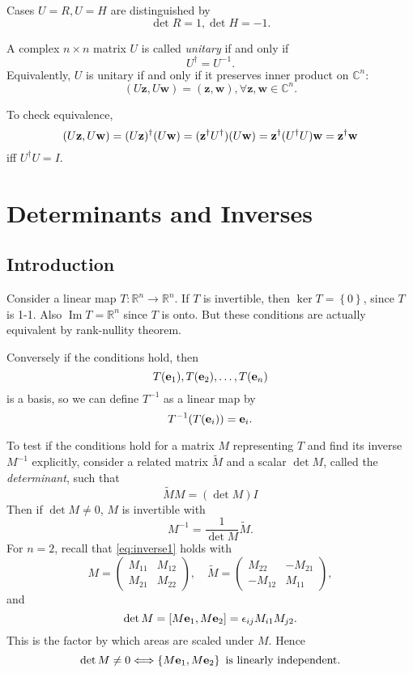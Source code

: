 \documentclass[10pt]{article}
\DeclareMathOperator{\im}{Im}
\begin{document}
    \begin{remark}
        Cases $ U=R, U=H $ are distinguished by 
        \[
            \det R=1, \det H=-1
        .\]
    \end{remark}
    \begin{definition}
        A complex $n\times n$ matrix $U$ is called \textit{unitary} if and only if 
        \[
            U^\dagger =U^{-1}
        .\]
        Equivalently, $U$ is unitary if and only if it preserves inner product on $ \mathbb{C}^{n} $:
        \[
            (U \mathbf{z}, U \mathbf{w})=(\mathbf{z},\mathbf{w}), \forall \mathbf{z},\mathbf{w}\in \mathbb{C}^{n}
        .\]
    \end{definition}
    To check equivalence, 
    \[
            (U \mathbf{z}, U \mathbf{w})=(U \mathbf{z})^\dagger (U \mathbf{w})=({\bf z}^\dagger U^\dagger )(U {\bf w} )={\bf z}^\dagger (U^\dagger U){\bf w}={\bf z}^\dagger {\bf w}
    \]
    iff $ U^\dagger U=I $.
    \section{Determinants and Inverses}
    \subsection{Introduction}
    Consider a linear map $ T: \mathbb{R}^{n}\to \mathbb{R}^{n} $. If $T$ is invertible, then $ \ker T=\left\{ 0\right\} $, since $T$ is 1-1. Also $ \im T=\mathbb{R}^{n} $ since $T$ is onto. But these conditions are actually equivalent by rank-nullity theorem.

    Conversely if the conditions hold, then
    \[
        T(\mathbf{e}_1), T(\mathbf{e}_2),\dots,T({\bf e}_n)
    \]
    is a basis, so we can define $ T^{-1} $ as a linear map by 
    \[
        T^{-1}(T({\bf e}_i))={\bf e}_i
    .\]

    To test if the conditions hold for a matrix $M$ representing $T$ and find its inverse $M^{-1}$ explicitly, consider a related matrix $ \tilde{M} $ and a scalar $ \det M $, called the \textit{determinant}, such that 
    \begin{equation}\label{eq:inverse1}
        \tilde{M}M=(\det M)I
    \end{equation}
    Then if $ \det M\neq 0 $, $M$ is invertible with
    \[
        M^{-1}=\frac{1}{\det M}\tilde{M}
    .\]
    For $n=2$, recall that \ref{eq:inverse1} holds with 
    \[
        M=\begin{pmatrix}
            M_{11}&M_{12}\\
            M_{21}&M_{22}
        \end{pmatrix},\quad \tilde{M}=\begin{pmatrix}
            M_{22}&-M_{21}\\
            -M_{12}&M_{11}
        \end{pmatrix},
    \]
    and 
    \[
        \det M=[M {\bf e}_1, M{\bf e}_2]=\epsilon_{ij}M_{i1}M_{j2}
    .\]
    This is the factor by which areas are scaled under $M$. Hence 
    \[
        \det M \neq 0 \Longleftrightarrow \left\{ M{\bf e}_1, M{\bf e}_2\right\}\text{ is linearly independent}
    .\]
\end{document}
